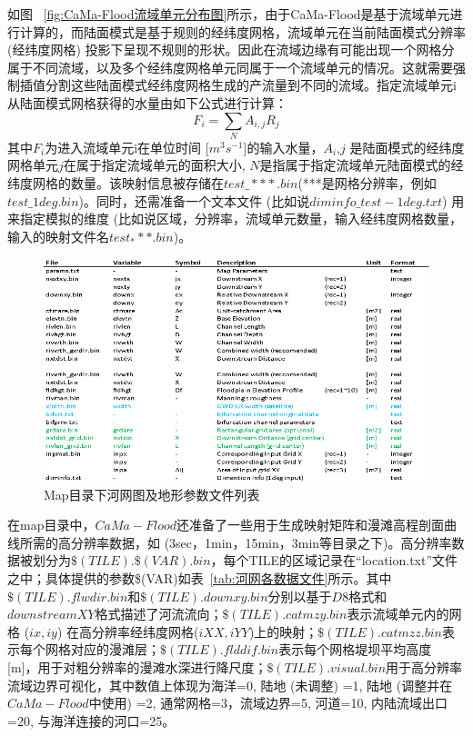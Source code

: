 如图 ~\ref{fig:CaMa-Flood流域单元分布图}所示，由于CaMa-Flood是基于流域单元进行计算的，而陆面模式是基于规则的经纬度网格，流域单元在当前陆面模式分辨率 (经纬度网格) 投影下呈现不规则的形状。因此在流域边缘有可能出现一个网格分属于不同流域，以及多个经纬度网格单元同属于一个流域单元的情况。这就需要强制插值分割这些陆面模式经纬度网格生成的产流量到不同的流域。指定流域单元i从陆面模式网格获得的水量由如下公式进行计算：
\begin{equation}
F_{i}=\sum_{N} A_{i, j} R_{j}
\end{equation}
其中$F_i$为进入流域单元i在单位时间 [$m^3s^{-1}$]的输入水量，$A_i$,$j$ 是陆面模式的经纬度网格单元$j$在属于指定流域单元的面积大小, $N$是指属于指定流域单元陆面模式的经纬度网格的数量。该映射信息被存储在$test\_***.bin$(***是网格分辨率，例如 $test\_1deg.bin$)。同时，还需准备一个文本文件 (比如说$diminfo\_test-1deg.txt$) 用来指定模拟的维度 (比如说区域，分辨率，流域单元数量，输入经纬度网格数量，输入的映射文件名$test_***.bin$)。
{
\begin{figure}[]
\centering
\includegraphics{Figures/基础数据/CaMa-FloodMap目录下河网图及地形参数文件列表.png}
\caption{Map目录下河网图及地形参数文件列表}
\label{tab:CaMa-FloodMap目录下河网图及地形参数文件列表}
\end{figure}
}


在map目录中，$CaMa-Flood$还准备了一些用于生成映射矩阵和漫滩高程剖面曲线所需的高分辨率数据，如 (3sec，1min，15min，3min等目录之下)。高分辨率数据被划分为$\$(TILE).\$(VAR).bin$，每个TILE的区域记录在“location.txt”文件之中；具体提供的参数\$(VAR)如表~\ref{tab:河网各数据文件}所示。其中$\$(TILE).flwdir.bin$和$\$(TILE).downxy.bin$分别以基于$D8$格式和$downstreamXY$格式描述了河流流向；$\$(TILE).catmzy.bin$表示流域单元内的网格 ($ix,iy$) 在高分辨率经纬度网格($iXX,iYY$)上的映射；$\$(TILE).catmzz.bin$表示每个网格对应的漫滩层；$\$(TILE).flddif.bin$表示每个网格堤坝平均高度 [m]，用于对粗分辨率的漫滩水深进行降尺度；$\$(TILE).visual.bin$用于高分辨率流域边界可视化，其中数值上体现为海洋=0, 陆地 (未调整) =1, 陆地 (调整并在$CaMa-Flood$中使用) =2, 通常网格=3，流域边界=5, 河道=10, 内陆流域出口=20, 与海洋连接的河口=25。


